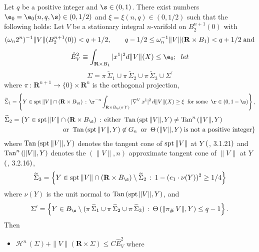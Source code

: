 \documentclass[a4paper,11pt]{amsart}
\begin{document}
\begin{theorem} \label{flat-varifolds}
Let $q$ be a positive integer and $\s \in (0, 1)$. There exist numbers $\e_{0} = \e_{0}(n, q, \s) \in (0, 1/2)$ and $\xi = \xi(n, q) \in (0, 1/2)$ such that the following holds: Let $V$ be a stationary integral $n$-varifold on 
$B_{2}^{n+1}(0)$ with $$(\omega_{n}2^{n})^{-1}\|V\|(B_{2}^{n+1}(0)) < q + 1/2, \;\;\;\;\;\;\; q - 1/2 \leq \omega_{n}^{-1}\|V\|({\mathbf R} \times B_{1}) < q + 1/2 \; {\rm and}$$  
$${\hat E}_{V}^{2} \equiv \int_{{\mathbf R} \times B_{1}} |x^{1}|^{2} d\|V\|(X) \leq \e_{0}; \;\; let$$
$$\Sigma = \pi \, \widetilde{\Sigma}_{1} \cup \pi \, \widetilde{\Sigma}_{2} \cup \pi \, \widetilde{\Sigma}_{3} \cup \Sigma^{\prime}$$
where $\pi \,: \, {\mathbf R}^{n+1} \to \{0\} \times {\mathbf R}^{n}$ is the orthogonal projection, 
$$\widetilde{\Sigma}_{1} = \left\{ Y \in {\rm spt} \, \|V\| \cap ({\mathbf R} \times B_{\s}) \, :\, \r^{-n}\int_{{\mathbf R} \times B_{\r}(\pi \, Y)} |\nabla^{V} \, x^{1}|^{2} \, d\|V\|(X) \geq \xi \;\; \mbox{\rm{for some}} \;\; \r \in (0, 1-\s)\right\},$$
\begin{eqnarray*}
\widetilde{\Sigma}_{2} = \left\{Y \in {\rm spt} \, \|V\| \cap ({\mathbf R} \times B_{\s}) \,: \, {\rm either} \;\; {\rm Tan} \, ({\rm spt} \, \|V\|, Y) \neq {\rm Tan}^{n} \, (\|V\|, Y)\right.&&\\
&&\hspace{-3.5in}\left.{\rm or} \;\; {\rm Tan} \, ({\rm spt} \, \|V\|, Y) \not\in G_{n} \;\; {\rm or} \;\; \Theta \, (\|V\|, Y) \; \mbox{\rm{is not a positive integer}}\right\}
\end{eqnarray*}
where ${\rm Tan} \, ({\rm spt} \, \|V\|, Y)$ denotes the tangent cone of ${\rm spt} \, \|V\|$ at $Y$ 
${\rm (}$\cite{F}, 3.1.21$\rm )$ and ${\rm Tan}^{n} \, (\|V\|, Y)$ denotes the $(\|V\|, n)$ approximate tangent cone
of $\|V\|$ at $Y$ ${\rm (}$\cite{F}, 3.2.16${\rm )}$,
$$\widetilde{\Sigma}_{3} = \left\{Y \in {\rm spt} \, \|V\| \cap ({\mathbf R} \times B_{\s}) \setminus \widetilde{\Sigma}_{2}\, : \, 1 -  (e_{1} \cdot \nu(Y))^{2}\geq 1/4\right\}$$
where $\nu(Y)$ is the unit normal to ${\rm Tan} \, ({\rm spt} \, \|V\|, Y)$, and 
$$\Sigma^{\prime} = \left\{Y \in B_{\s} \setminus (\pi \, \widetilde{\Sigma}_{1} \cup \pi \, \widetilde{\Sigma}_{2} \cup \pi \, \widetilde{\Sigma}_{3}) \, : \, \Theta \, (\|\pi_{\#} \, V\|, Y) \leq q-1\right\}.$$
Then  
\begin{itemize}
\item[(a)] ${\mathcal H}^{n} \,(\Sigma) + \|V\|({\mathbf R} \times \Sigma) \leq C{\hat E}_{V}^{2}$ where 

\end{itemize}
\end{theorem}
\end{document}

